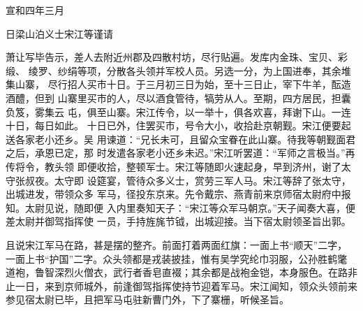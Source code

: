 宣和四年三月

日梁山泊义士宋江等谨请

萧让写毕告示，差人去附近州郡及四散村坊，尽行贴遍。发库内金珠、宝贝、彩缎、
绫罗、纱绢等项，分散各头领并军校人员。另选一分，为上国进奉，其余堆集山寨，
尽行招人买市十日。于三月初三日为始，至十三日止，宰下牛羊，酝造酒醴，但到
山寨里买市的人，尽以酒食管待，犒劳从人。至期，四方居民，担囊负笈，雾集云
屯，俱至山寨。宋江传令，以一举十，俱各欢喜，拜谢下山。一连十日，每日如此。
十日已外，住罢买市，号令大小，收拾赴京朝觐。宋江便要起送各家老小还乡。吴
用谏道：“兄长未可，且留众宝眷在此山寨。待我等朝觐面君之后，承恩已定，那
时发遣各家老小还乡未迟。”宋江听罢道：“军师之言极当。”再传将令，教头领
即便收拾，整顿军士。宋江等随即火速起身，早到济州，谢了太守张叔夜。太守即
设筵宴，管待众多义士，赏劳三军人马。宋江等辞了张太守，出城进发，带领众多
军马，径投东京来。先令戴宗、燕青前来京师宿太尉府中报知。太尉见说，随即便
入内里奏知天子：“宋江等众军马朝京。”天子闻奏大喜，便差太尉并御驾指挥使
一员，手持旌旄节钺，出城迎接。当下宿太尉领圣旨出郭。

且说宋江军马在路，甚是摆的整齐。前面打着两面红旗：一面上书“顺天”二字，
一面上书“护国”二字。众头领都是戎装披挂，惟有吴学究纶巾羽服，公孙胜鹤氅
道袍，鲁智深烈火僧衣，武行者香皂直裰；其余都是战袍金铠，本身服色。在路非
止一日，来到京师城外，前逢御驾指挥使持节迎着军马。宋江闻知，领众头领前来
参见宿太尉已毕，且把军马屯驻新曹门外，下了寨栅，听候圣旨。


